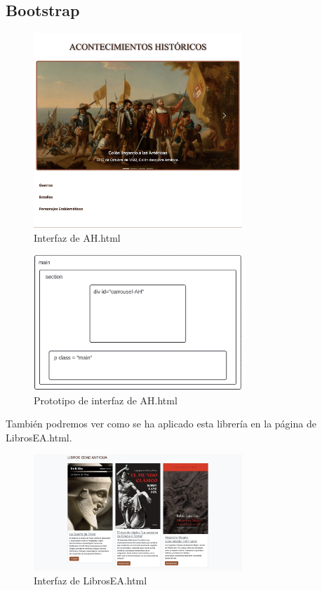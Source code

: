 \documentclass{article}
\begin{document}
\subsection{Bootstrap}

\begin{figure}[H]
    \centering
    \includegraphics[width=0.7\textwidth]{cssFotos/bootstrap.jpg}
    \caption{Interfaz de AH.html}
    \label{fig:foro_interface}
\end{figure}

\begin{figure}[H]
    \centering
    \includegraphics[width=0.7\textwidth]{cssFotos/bootstrapEsquema.jpg}
    \caption{Prototipo de interfaz de AH.html}
    \label{fig:prototipo_foro}
\end{figure}

También podremos ver como se ha aplicado esta librería en la página de LibrosEA.html.

\begin{figure}[H]
    \centering
    \includegraphics[width=0.7\textwidth]{cssFotos/LibrosEA.jpg}
    \caption{Interfaz de LibrosEA.html}
    \label{fig:foro_interface}
\end{figure}
\end{document}
